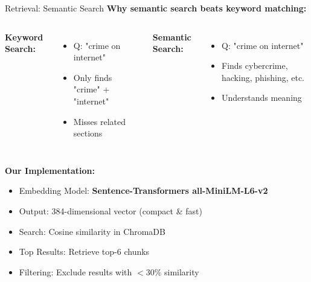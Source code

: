 \documentclass[11pt,aspectratio=16:9]{beamer}
\begin{document}
\begin{frame}{Retrieval: Semantic Search}
    \textbf{Why semantic search beats keyword matching:}
    
    \vspace{0.5cm}
    
    \begin{columns}
        \textbf{Keyword Search:}
        \begin{itemize}
            \item Q: "crime on internet"
            \item Only finds "crime" + "internet"
            \item Misses related sections
        \end{itemize}
        
        \textbf{Semantic Search:}
        \begin{itemize}
            \item Q: "crime on internet"
            \item Finds cybercrime, hacking, phishing, etc.
            \item Understands meaning
        \end{itemize}
    \end{columns}
    
    \vspace{0.8cm}
    
    \textbf{Our Implementation:}
    \begin{itemize}
        \item Embedding Model: \textbf{Sentence-Transformers all-MiniLM-L6-v2}
        \item Output: 384-dimensional vector (compact \& fast)
        \item Search: Cosine similarity in ChromaDB
        \item Top Results: Retrieve top-6 chunks
        \item Filtering: Exclude results with $<30\%$ similarity
    \end{itemize}
\end{frame}
\end{document}

